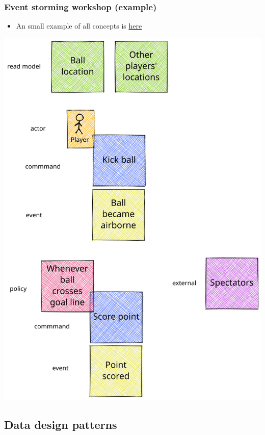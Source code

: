\documentclass[8pt]{article}
\begin{document}
\subsubsection{Event storming workshop (example)}
\label{sec:org7125533}
\begin{itemize}
\item An small example of all concepts is \href{https://excalidraw.com/\#json=vxsHdxpc7576WIp-WA8TC,vWuOODe-XG1sA4K0NtGPnw}{here}
\end{itemize}
\begin{center}
\includegraphics[width=.9\linewidth]{graphics/svg/event-storming-excalidraw.png}
\end{center}
\subsection{Data design patterns}
\label{sec:org1236420}
\end{document}

